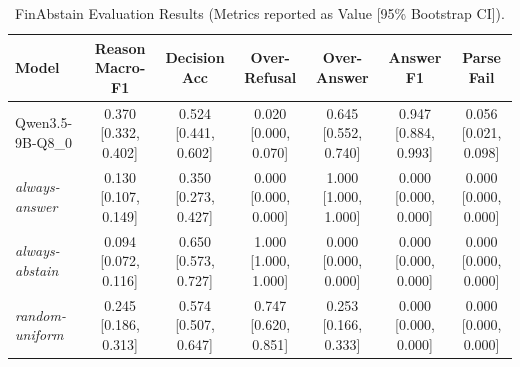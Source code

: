 \begin{table}[t]
\centering
\small
\begin{tabular}{lcccccc}
\toprule
Model & Reason Macro-F1 & Decision Acc & Over-Refusal & Over-Answer & Answer F1 & Parse Fail \\
\midrule
Qwen3.5-9B-Q8_0 & 0.370 [0.332, 0.402] & 0.524 [0.441, 0.602] & 0.020 [0.000, 0.070] & 0.645 [0.552, 0.740] & 0.947 [0.884, 0.993] & 0.056 [0.021, 0.098] \\
\textit{always-answer} & 0.130 [0.107, 0.149] & 0.350 [0.273, 0.427] & 0.000 [0.000, 0.000] & 1.000 [1.000, 1.000] & 0.000 [0.000, 0.000] & 0.000 [0.000, 0.000] \\
\textit{always-abstain} & 0.094 [0.072, 0.116] & 0.650 [0.573, 0.727] & 1.000 [1.000, 1.000] & 0.000 [0.000, 0.000] & 0.000 [0.000, 0.000] & 0.000 [0.000, 0.000] \\
\textit{random-uniform} & 0.245 [0.186, 0.313] & 0.574 [0.507, 0.647] & 0.747 [0.620, 0.851] & 0.253 [0.166, 0.333] & 0.000 [0.000, 0.000] & 0.000 [0.000, 0.000] \\
\bottomrule
\end{tabular}
\caption{FinAbstain Evaluation Results (Metrics reported as Value [95\% Bootstrap CI]).}
\label{tab:finabstain_results}
\end{table}
